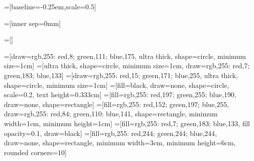 \usepackage{tikz}
\usetikzlibrary{backgrounds}
\usetikzlibrary{arrows}
\usetikzlibrary{shapes,shapes.geometric,shapes.misc}
\usetikzlibrary{fadings}
\usetikzlibrary{3d,decorations.text,shapes.arrows,positioning,fit}

{}=[baseline=-0.25em,scale=0.5]


=[inner sep=0mm]

\newcommand{\tikzfig}[1]{%
{\tikzstyle{every picture}=[tikzfig]
\IfFileExists{#1.tikz}
  {}
  {%
    \IfFileExists{./figures/#1.tikz}
      {}
      {\tikz[baseline=-0.5em]{\node[draw=red,font=\color{red},fill=red!10!white] {\textit{#1}};}}%
  }}%
}

\newcommand{\ctikzfig}[1]{%
\begin{center}\rm
  \tikzfig{#1}
\end{center}}

=[]


=[draw={rgb,255: red,8; green,111; blue,175}, ultra thick, shape=circle, minimum size=1cm]
=[ultra thick, shape=circle, minimum size=1cm, draw={rgb,255: red,7; green,183; blue,133}]
=[draw={rgb,255: red,15; green,171; blue,255}, ultra thick, shape=circle, minimum size=1cm]
=[fill=black, draw=none, shape=circle, scale=0.2, text height=0.333cm]
=[fill={rgb,255: red,197; green,255; blue,190}, draw=none, shape=rectangle]
=[fill={rgb,255: red,152; green,197; blue,255}, draw={rgb,255: red,84; green,110; blue,141}, shape=rectangle, minimum width=1cm, minimum height=1cm]
=[fill={rgb,255: red,7; green,183; blue,133}, fill opacity=0.1, draw=black]
=[fill={rgb,255: red,244; green,244; blue,244}, draw=none, shape=rectangle, minimum width=3cm, minimum height=6cm, rounded corners=10]


